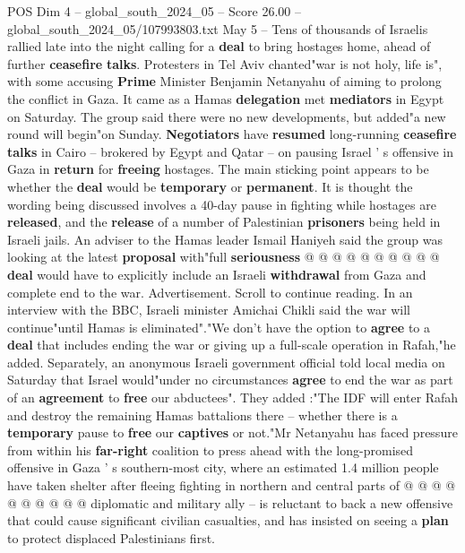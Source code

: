 \begin{textsample}{POS Dim 4 – global\_south\_2024\_05 – Score 26.00 – global\_south\_2024\_05/107993803.txt}  \label{ex:f4_pos_182}
May 5 -- Tens of thousands of Israelis rallied late into the night calling for a \textbf{deal} to bring hostages home, ahead of further \textbf{ceasefire} \textbf{talks}.
Protesters in Tel Aviv chanted"war is not holy, life is", with some accusing \textbf{Prime} Minister Benjamin Netanyahu of aiming to prolong the conflict in Gaza.
It came as a Hamas \textbf{delegation} met \textbf{mediators} in Egypt on Saturday.
The group said there were no new developments, but added"a new round will begin"on Sunday. \textbf{Negotiators} have \textbf{resumed} long-running \textbf{ceasefire} \textbf{talks} in Cairo -- brokered by Egypt and Qatar -- on pausing Israel ' s offensive in Gaza in \textbf{return} for \textbf{freeing} hostages.
The main sticking point appears to be whether the \textbf{deal} would be \textbf{temporary} or \textbf{permanent}.
It is thought the wording being discussed involves a 40-day pause in fighting while hostages are \textbf{released}, and the \textbf{release} of a number of Palestinian \textbf{prisoners} being held in Israeli jails.
An adviser to the Hamas leader Ismail Haniyeh said the group was looking at the latest \textbf{proposal} with"full \textbf{seriousness} @ @ @ @ @ @ @ @ @ @ \textbf{deal} would have to explicitly include an Israeli \textbf{withdrawal} from Gaza and complete end to the war.
Advertisement.
Scroll to continue reading.
In an interview with the BBC, Israeli minister Amichai Chikli said the war will continue"until Hamas is eliminated"."We don't have the option to \textbf{agree} to a \textbf{deal} that includes ending the war or giving up a full-scale operation in Rafah,"he added.
Separately, an anonymous Israeli government official told local media on Saturday that Israel would"under no circumstances \textbf{agree} to end the war as part of an \textbf{agreement} to \textbf{free} our abductees".
They added :"The IDF will enter Rafah and destroy the remaining Hamas battalions there -- whether there is a \textbf{temporary} pause to \textbf{free} our \textbf{captives} or not."Mr Netanyahu has faced pressure from within his \textbf{far-right} coalition to press ahead with the long-promised offensive in Gaza ' s southern-most city, where an estimated 1.4 million people have taken shelter after fleeing fighting in northern and central parts of @ @ @ @ @ @ @ @ @ @ diplomatic and military ally -- is reluctant to back a new offensive that could cause significant civilian casualties, and has insisted on seeing a \textbf{plan} to protect displaced Palestinians first.

\end{textsample}
